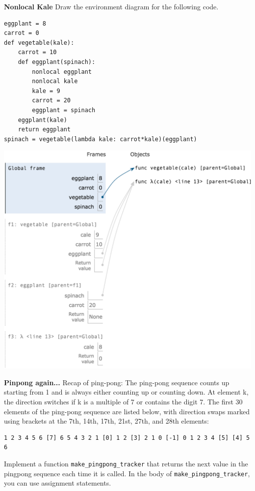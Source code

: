 \documentclass{exam}
\begin{document}
\begin{questions}

\begin{blocksection}
\question \textbf{Nonlocal Kale} \newline
Draw the environment diagram for the following code.

\begin{lstlisting}
eggplant = 8
carrot = 0
def vegetable(kale):
    carrot = 10
    def eggplant(spinach):
        nonlocal eggplant
        nonlocal kale
        kale = 9
        carrot = 20
        eggplant = spinach
    eggplant(kale)
    return eggplant
spinach = vegetable(lambda kale: carrot*kale)(eggplant)
\end{lstlisting}

\begin{solution}[3in]
    \includegraphics[scale=0.5]{img/kale.png}
\end{solution}

\end{blocksection}

\begin{blocksection}
\question \textbf{Pinpong again...}  \newline
Recap of ping-pong: The ping-pong sequence counts up starting from 1 and is always either counting up or counting down. At element k, the direction switches if k is a multiple of 7 or contains the digit 7. The first 30 elements of the ping-pong sequence are listed below, with direction swaps marked using brackets at the 7th, 14th, 17th, 21st, 27th, and 28th elements:
\begin{lstlisting}
1 2 3 4 5 6 [7] 6 5 4 3 2 1 [0] 1 2 [3] 2 1 0 [-1] 0 1 2 3 4 [5] [4] 5 6
\end{lstlisting}
Implement a function \texttt{make\_pingpong\_tracker} that returns the next value in the pingpong sequence each time it is called.  In the body of \texttt{make\_pingpong\_tracker}, you can use assignment statements.
\newline


\end{blocksection}
\end{questions}
\end{document}
